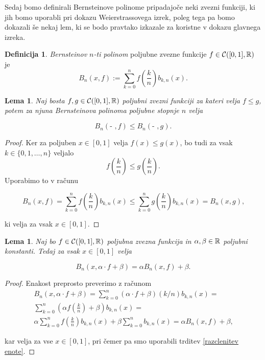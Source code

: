 \documentclass[a4paper, reqno]{amsart}
\theoremstyle{theorem}
\newtheorem{lema}[izrek]{Lema}
\theoremstyle{definition}
\newtheorem{definicija}{Definicija}[section]
\begin{document}

Sedaj bomo definirali Bernsteinove polinome pripadajoče neki zvezni funkciji, 
ki jih bomo uporabli pri dokazu Weierstrassovega
izrek, poleg tega pa bomo dokazali še nekaj lem, ki se bodo pravtako izkazale za koristne
v dokazu glavnega izreka. 

\begin{definicija}
	\emph{Bernsteinov $n$-ti polinom} poljubne zvezne funkcije $f \in \mathcal{C}([0,1],\mathbb{R})$ je
	$$ B_n(x, f) := \sum_{k = 0}^n f\left(\frac kn\right)b_{k,n}(x)\text{.}$$

\end{definicija}

\begin{lema}
	\label{monotonost}
	Naj bosta $f, g \in \mathcal{C}([0,1],\mathbb{R})$ poljubni zvezni funkciji za kateri velja $f \leq g$, potem za
	njuna Bernsteinova polinoma poljubne stopnje $n$ velja

	$$ B_n(\text{- },f) \leq B_n(\text{- },g)\text{.}$$ 
\end{lema}

\begin{proof}
	Ker za poljuben $x \in [0,1]$ velja $f(x) \leq g(x)$, bo tudi za vsak $k \in \{0,1,\dots, n\}$
	veljalo
	$$ f\left(\frac kn\right) \leq g\left(\frac kn\right)\text{.}$$
	Uporabimo to v računu

	$$ B_n(x, f) = \sum_{k = 0}^n f\left(\frac kn\right)b_{k,n}(x) \leq 
	\sum_{k = 0}^n g\left(\frac kn\right)b_{k,n}(x) = B_n(x, g)\text{,}$$

	ki velja za vsak $x \in [0,1]$.
\end{proof}

\begin{lema}
	\label{linearnost}
	Naj bo $f \in \mathcal{C}([0,1],\mathbb{R})$ poljubna zvezna funkcija in $\alpha, \beta \in \mathbb{R}$ poljubni konstanti.
	Tedaj za vsak $x \in [0,1]$ velja 

	$$ B_n(x, \alpha \cdot f + \beta) = \alpha B_n(x, f) + \beta\text{.}$$
\end{lema}

\begin{proof}
	Enakost preprosto preverimo z računom
	\begin{multline*}
	B_n(x, \alpha \cdot f + \beta) = 
	\sum_{k = 0}^n (\alpha \cdot f + \beta)\left( k/n \right)b_{k,n}(x) =\\
	\sum_{k = 0}^n (\alpha f\left(\frac kn \right) + \beta)b_{k,n}(x) =\\
	\alpha \sum_{k = 0}^n f\left(\frac kn\right)b_{k,n}(x) + \beta \sum_{k = 0}^n b_{k,n}(x) =
	\alpha B_n(x, f) + \beta\text{,}
\end{multline*}

kar velja za vse $x \in [0,1]$, pri čemer pa smo uporabili trditev \ref{razclenitev enote}.
\end{proof}
\end{document}
